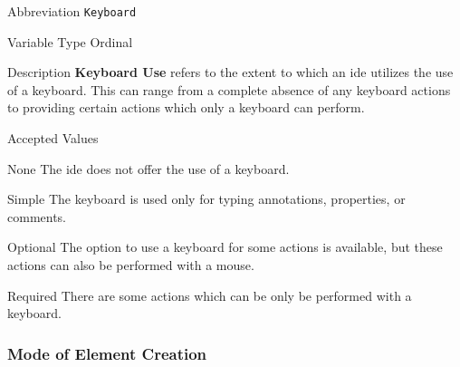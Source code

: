 \begin{AlignedDesc}
  \item[Abbreviation] \texttt{Keyboard}

  \item[Variable Type] Ordinal

  \item[Description] \textbf{Keyboard Use} refers to the extent to which an
  \ac{ide} utilizes the use of a keyboard. This can range from a complete
  absence of any keyboard actions to providing certain actions which only a
  keyboard can perform.

  \item[Accepted Values]

  \begin{AlignedDesc}
    \item[None] The \ac{ide} does not offer the use of a keyboard.
    \item[Simple] The keyboard is used only for typing annotations,
      properties, or comments.
    \item[Optional] The option to use a keyboard for some actions is
    available, but these actions can also be performed with a mouse.
    \item[Required] There are some actions which can be only be performed
    with a keyboard.
  \end{AlignedDesc}

\end{AlignedDesc}

\subsubsection{Mode of Element Creation}
\label{subsubsec:mode}


